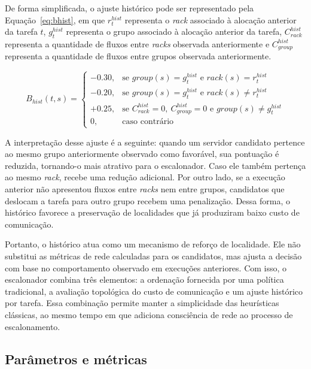 \documentclass[12pt]{article}
\begin{document}
De forma simplificada, o ajuste histórico pode ser representado pela Equação~\ref{eq:bhist}, em que $r_t^{hist}$ representa o \textit{rack} associado à alocação anterior da tarefa $t$, $g_t^{hist}$ representa o grupo associado à alocação anterior da tarefa, $C_{rack}^{hist}$ representa a quantidade de fluxos entre \textit{racks} observada anteriormente e $C_{group}^{hist}$ representa a quantidade de fluxos entre grupos observada anteriormente.

\begin{equation}
B_{hist}(t,s) =
\begin{cases}
-0.30, & \text{se } group(s)=g_t^{hist} \text{ e } rack(s)=r_t^{hist} \\
-0.20, & \text{se } group(s)=g_t^{hist} \text{ e } rack(s)\neq r_t^{hist} \\
+0.25, & \text{se } C_{rack}^{hist}=0,\ C_{group}^{hist}=0 \text{ e } group(s)\neq g_t^{hist} \\
0, & \text{caso contrário}
\end{cases}
\label{eq:bhist}
\end{equation}

A interpretação desse ajuste é a seguinte: quando um servidor candidato pertence ao mesmo grupo anteriormente observado como favorável, sua pontuação é reduzida, tornando-o mais atrativo para o escalonador. Caso ele também pertença ao mesmo \textit{rack}, recebe uma redução adicional. Por outro lado, se a execução anterior não apresentou fluxos entre \textit{racks} nem entre grupos, candidatos que deslocam a tarefa para outro grupo recebem uma penalização. Dessa forma, o histórico favorece a preservação de localidades que já produziram baixo custo de comunicação.

Portanto, o histórico atua como um mecanismo de reforço de localidade. 
%
Ele não substitui as métricas de rede calculadas para os candidatos, mas ajusta a decisão com base no comportamento observado em execuções anteriores. Com isso, o escalonador combina três elementos: a ordenação fornecida por uma política tradicional, a avaliação topológica do custo de comunicação e um ajuste histórico por tarefa. Essa combinação permite manter a simplicidade das heurísticas clássicas, ao mesmo tempo em que adiciona consciência de rede ao processo de escalonamento.

\subsection{Parâmetros e métricas}
\label{subsec:configuracao_experimentos}
\end{document}
